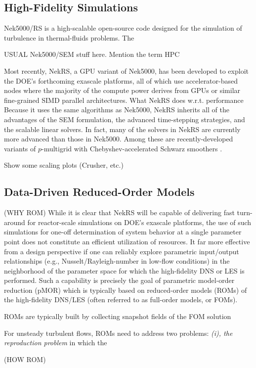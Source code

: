 

\subsection{High-Fidelity Simulations}

Nek5000/RS is a high-scalable open-source code designed for the simulation
of turbulence in thermal-fluids problems.   The 

USUAL Nek5000/SEM stuff here.
Mention the term HPC


Most recently, NekRS, a GPU variant of Nek5000, has been developed to
exploit the DOE's forthcoming exascale platforms, all of which use
accelerator-based nodes where the majority of the compute power derives
from GPUs or similar fine-grained SIMD parallel architectures.
  What NekRS does w.r.t. performance
Because it uses the same algorithms as Nek5000, NekRS inherits
all of the advantages of the SEM formulation, the advanced 
time-stepping strategies, and the scalable linear solvers.
In fact, many of the solvers in NekRS are currently more advanced
than those in Nek5000.   Among these are recently-developed variants
of $p$-multigrid with Chebyshev-accelerated Schwarz smoothers \cite{siam22a}.

Show some scaling plots (Crusher, etc.)

\subsection{Data-Driven Reduced-Order Models}

(WHY ROM)
While it is clear that NekRS will be capable of delivering fast turn-around
for reactor-scale simulations on DOE's exascale platforms, the use of 
such simulations for one-off determination of system behavior at a single
parameter point does not constitute an efficient utilization of resources. 
It far more effective from a design perspective if one can reliably explore
parametric input/output relationships (e.g., Nusselt/Rayleigh-number in
low-flow conditions) in the neighborhood of the parameter space for which
the high-fidelity DNS or LES is performed.   Such a capability is precisely
the goal of parametric model-order reduction (pMOR) which is typically based
on reduced-order models (ROMs) of the high-fidelity DNS/LES (often referred
to as full-order models, or FOMs).   

ROMs are typically built by collecting snapshot fields of the FOM solution


For unsteady turbulent flows, ROMs need to address two problems: 
{\em (i), the reproduction problem} in which the 




(HOW ROM)











